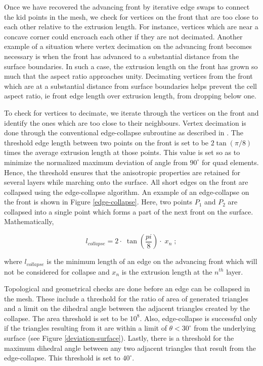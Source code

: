 Once we have recovered the advancing front by iterative edge swaps to connect the kid points in the mesh, we check for vertices on the front that are too close to each other relative to the extrusion length. For instance, vertices which are near a concave corner could encroach each other if they are not decimated. Another example of a situation where vertex decimation on the advancing front becomes necessary is when the front has advanced to a substantial distance from the surface boundaries. In such a case, the extrusion length on the front has grown so much that the aspect ratio approaches unity. Decimating vertices from the front which are at a substantial distance from surface boundaries helps prevent the cell aspect ratio, ie front edge length over extrusion length, from dropping below one.

To check for vertices to decimate, we iterate through the vertices on the front and identify the ones which are too close to their neighbours. Vertex decimation is done through the conventional edge-collapse subroutine as described in \cite{hoppe1994mesh}. The threshold edge length between two points on the front is set to be $2 \tan(\pi/8)$ times the average extrusion length at those points. This value is set so as to minimize the normalized maximum deviation of angle from $90^\circ$ for quad elements. Hence, the threshold ensures that the anisotropic properties are retained for several layers while marching onto the surface. All short edges on the front are collapsed using the edge-collapse algorithm. An example of an edge-collapse on the front is shown in Figure \ref{edge-collapse}. Here, two points $P_1$ and $P_2$ are collapsed into a single point which forms a part of the next front on the surface. Mathematically,

\begin{equation}
l_{\mathit{collapse}} = 2 \cdot \; \tan \left( \frac{pi}{8} \right) \cdot \; x_n \; ;
\end{equation}

where $l_{\mathit{collapse}}$ is the minimum length of an edge on the advancing front which will not be considered for collapse and $x_n$ is the extrusion length at the $n^{th}$ layer.


Topological and geometrical checks are done before an edge can be collapsed in the mesh. These include a threshold for the ratio of area of generated triangles and a limit on the dihedral angle between the adjacent triangles created by the collapse. The area threshold is set to be $10^8$. Also, edge-collapse is successful only if the triangles resulting from it are  within a limit of $\theta < 30^{\circ}$ from the underlying surface (see Figure \ref{deviation-surface}). Lastly, there is a threshold for the maximum dihedral angle between any two adjacent triangles that result from the edge-collapse. This threshold is set to $40^{\circ}$. 

